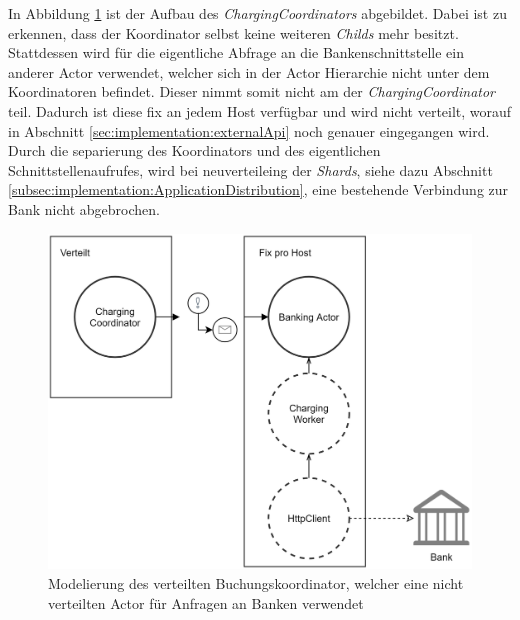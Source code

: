 In Abbildung \ref{fig:implementation:ChargingCoordinatorSample} ist der Aufbau des \textit{ChargingCoordinators} abgebildet. Dabei ist zu erkennen, dass der Koordinator selbst keine weiteren \textit{Childs} mehr besitzt. Stattdessen wird für die eigentliche Abfrage an die Bankenschnittstelle ein anderer Actor verwendet, welcher sich in der Actor Hierarchie nicht unter dem Koordinatoren befindet. Dieser nimmt somit nicht am  der \textit{ChargingCoordinator} teil. Dadurch ist diese fix an jedem Host verfügbar und wird nicht verteilt, worauf in Abschnitt \ref{sec:implementation:externalApi} noch genauer eingegangen wird. Durch die separierung des Koordinators und des eigentlichen Schnittstellenaufrufes, wird bei neuverteileing der \textit{Shards}, siehe dazu Abschnitt \ref{subsec:implementation:ApplicationDistribution}, eine bestehende Verbindung zur Bank nicht abgebrochen. 
\begin{figure}
    \centering
    \includegraphics[width=0.65\linewidth]{gfx/implementation/ChargingCoordinatorSample}
    \caption{Modelierung des verteilten Buchungskoordinator, welcher eine nicht verteilten Actor für Anfragen an Banken verwendet}
    \label{fig:implementation:ChargingCoordinatorSample}
\end{figure}


